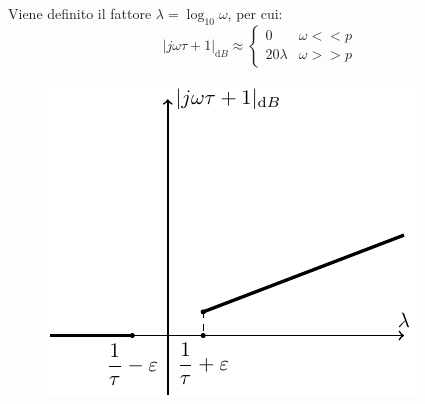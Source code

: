 \documentclass{article}
\numberwithin{equation}{subsection}
\newcommand{\df}{\mathrm{d}}
\begin{document}
Viene definito il fattore $\lambda=\log_{10}\omega$, per cui:
\begin{equation*}
    |j\omega\tau+1|_{\df B}\approx
    \begin{cases}
        0&\omega<<p\\
        20\lambda&\omega>>p
    \end{cases}
\end{equation*}

\begin{figure}[H]%
    \centering
    \includegraphics{modulo-bode-1.pdf}%
\end{figure}
\end{document}
